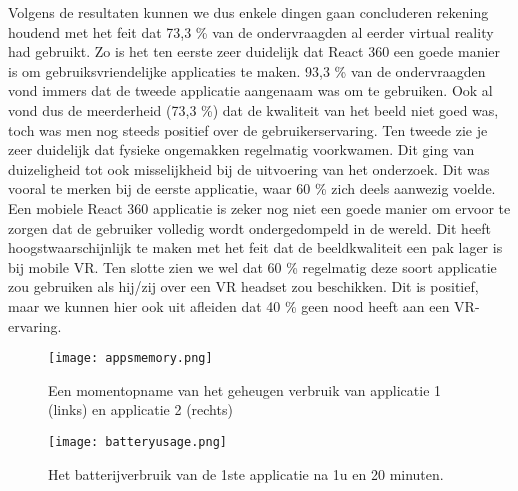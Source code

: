 Volgens de resultaten kunnen we dus enkele dingen gaan concluderen rekening houdend met het feit dat 73,3 \% van de ondervraagden al eerder virtual reality had gebruikt. Zo is het ten eerste zeer duidelijk dat React 360 een goede manier is om gebruiksvriendelijke applicaties te maken. 93,3 \% van de ondervraagden vond immers dat de tweede applicatie aangenaam was om te gebruiken. Ook al vond dus de meerderheid (73,3 \%) dat de kwaliteit van het beeld niet goed was, toch was men nog steeds positief over de gebruikerservaring. Ten tweede zie je zeer duidelijk dat fysieke ongemakken regelmatig voorkwamen. Dit ging van duizeligheid tot ook misselijkheid bij de uitvoering van het onderzoek. Dit was vooral te merken bij de eerste applicatie, waar  60 \% zich deels aanwezig voelde. Een mobiele React 360 applicatie is zeker nog niet een goede manier om ervoor te zorgen dat de gebruiker volledig wordt ondergedompeld in de wereld. Dit heeft hoogstwaarschijnlijk te maken met het feit dat de beeldkwaliteit een pak lager is bij mobile VR. Ten slotte zien we wel dat 60 \% regelmatig deze soort applicatie zou gebruiken als hij/zij over een VR headset zou beschikken. Dit is positief, maar we kunnen hier ook uit afleiden dat 40 \% geen nood heeft aan een VR-ervaring.

\begin{figure}
	\centering
	\texttt{[image: appsmemory.png]}
	\caption{Een momentopname van het geheugen verbruik van applicatie 1 (links) en applicatie 2 (rechts)}
	\label{fig:appsmemory}
\end{figure}

\begin{figure}
	\centering
	\texttt{[image: batteryusage.png]}
	\caption{Het batterijverbruik van de 1ste applicatie na 1u en 20 minuten.}
	\label{fig:batteryusage}
\end{figure}
